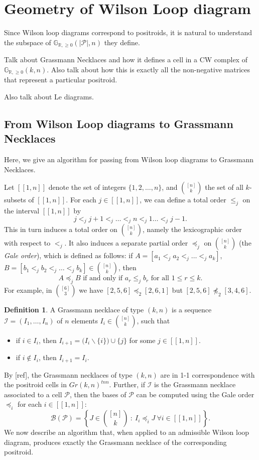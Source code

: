 \documentclass[11pt]{article}
\newcommand{\R}{\mathbb{R}}
\newcommand{\Gr}{\mathbb{G}_{\R, \geq 0}}
\newcommand{\cP}{\mathcal{P}}
\newcommand{\II}{\mathcal{I}}
\newcommand{\PP}{\mathcal{P}}
\newcommand{\BB}{\mathcal{B}}
\newcommand{\interval}[2]{[\![#1,#2]\!]}
\newcommand{\gale}[1]{\preccurlyeq_{#1}}
\theoremstyle{remark}
\theoremstyle{definition}
\newtheorem{dfn}[thm]{Definition}
\begin{document}
\section{Geometry of Wilson Loop diagram}
Since Wilson loop diagrams correspond to positroids, it is natural to understand the subspace of $\Gr(|\cP|, n)$ they define.

Talk about Grassmann Necklaces and how it defines a cell in a CW complex of $\Gr(k,n)$. Also talk about how this is exactly all the non-negative matrices that represent a particular positroid.

Also talk about Le diagrams.

\subsection{From Wilson Loop diagrams to Grassmann Necklaces}

Here, we give an algorithm for passing from Wilson loop diagrams to Grassmann Necklaces.

Let $\interval{1}{n}$ denote the set of integers $\{1,2, \dots, n\}$, and $\binom{[n]}{k}$ the set of all $k$-subsets of $\interval{1}{n}$.  For each $j \in \interval{1}{n}$, we can define a total order $\leq_j$ on the interval $\interval{1}{n}$ by
\[ j <_j j+1 <_j \dots <_j n <_j 1 \dots <_j j-1.\]
This in turn induces a total order on $\binom{[n]}{k}$, namely the lexicographic order with respect to $<_j$.  It also induces a separate partial order $\gale{j}$ on $\binom{[n]}{k}$ (the \textit{Gale order}), which is defined as follows: if $A = [a_1 <_j a_2 <_j \dots <_j a_k]$,  $B = [b_1 <_j b_2 <_j \dots <_j b_k] \in \binom{[n]}{k}$, then
\[A \gale{j} B \text{ if and only if } a_r \leq_j b_r \text{ for all }1 \leq r \leq k.\]
For example, in $\binom{[6]}{3}$ we have $[2,5,6]\gale{2} [2,6,1]$ but $[2,5,6]\not\gale{2}[3,4,6]$.


\begin{dfn}\label{def:grassmann necklace}
A Grassmann necklace of type $(k,n)$ is a sequence $\II = (I_1, \dots, I_n)$ of $n$ elements $I_i \in \binom{[n]}{k}$, such that
\begin{itemize}
\item if $i \in I_i$, then $I_{i+1} = \big(I_i \backslash \{i\}\big) \cup \{j\}$ for some $j \in \interval{1}{n}$.
\item if $i \not\in I_i$, then $I_{i+1} = I_i$.
\end{itemize}
\end{dfn}

By [ref], the Grassmann necklaces of type $(k,n)$ are in 1-1 correspondence with the positroid cells in $Gr(k,n)^{tnn}$.  Further, if $\II$ is the Grassmann necklace associated to a cell $\PP$, then the bases of $\PP$ can be computed using the Gale order $\gale{i}$ for each $i \in \interval{1}{n}$:
\[\BB(\PP) = \left\{J \in \binom{[n]}{k}\ :\ I_i \gale{i} J \ \forall i \in \interval{1}{n}\right\}.\]
We now describe an algorithm that, when applied to an admissible Wilson loop diagram, produces exactly the Grassmann necklace of the corresponding positroid.
\end{document}
